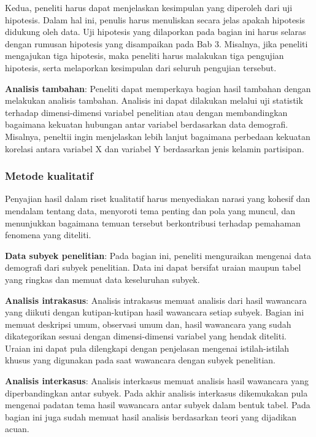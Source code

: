 \documentclass[
  indonesian,
  letterpaper,
]{scrbook}
\begin{document}
Kedua, peneliti harus dapat menjelaskan kesimpulan yang diperoleh dari
uji hipotesis. Dalam hal ini, penulis harus menuliskan secara jelas
apakah hipotesis didukung oleh data. Uji hipotesis yang dilaporkan pada
bagian ini harus selaras dengan rumusan hipotesis yang disampaikan pada
Bab 3. Misalnya, jika peneliti mengajukan tiga hipotesis, maka peneliti
harus malakukan tiga pengujian hipotesis, serta melaporkan kesimpulan
dari seluruh pengujian tersebut.

\textbf{Analisis tambahan}: Peneliti dapat memperkaya bagian hasil
tambahan dengan melakukan analisis tambahan. Analisis ini dapat
dilakukan melalui uji statistik terhadap dimensi-dimensi variabel
penelitian atau dengan membandingkan bagaimana kekuatan hubungan antar
variabel berdasarkan data demografi. Misalnya, peneltii ingin
menjelaskan lebih lanjut bagaimana perbedaan kekuatan korelasi antara
variabel X dan variabel Y berdasarkan jenis kelamin partisipan.

\subsubsection{Metode kualitatif}\label{metode-kualitatif}

Penyajian hasil dalam riset kualitatif harus menyediakan narasi yang
kohesif dan mendalam tentang data, menyoroti tema penting dan pola yang
muncul, dan menunjukkan bagaimana temuan tersebut berkontribusi terhadap
pemahaman fenomena yang diteliti.

\textbf{Data subyek penelitian}: Pada bagian ini, peneliti menguraikan
mengenai data demografi dari subyek penelitian. Data ini dapat bersifat
uraian maupun tabel yang ringkas dan memuat data keseluruhan subyek.

\textbf{Analisis intrakasus}: Analisis intrakasus memuat analisis dari
hasil wawancara yang diikuti dengan kutipan-kutipan hasil wawancara
setiap subyek. Bagian ini memuat deskripsi umum, observasi umum dan,
hasil wawancara yang sudah dikategorikan sesuai dengan dimensi-dimensi
variabel yang hendak diteliti. Uraian ini dapat pula dilengkapi dengan
penjelasan mengenai istilah-istilah khusus yang digunakan pada saat
wawancara dengan subyek penelitian.

\textbf{Analisis interkasus}: Analisis interkasus memuat analisis hasil
wawancara yang diperbandingkan antar subyek. Pada akhir analisis
interkasus dikemukakan pula mengenai padatan tema hasil wawancara antar
subyek dalam bentuk tabel. Pada bagian ini juga sudah memuat hasil
analisis berdasarkan teori yang dijadikan acuan.
\end{document}
